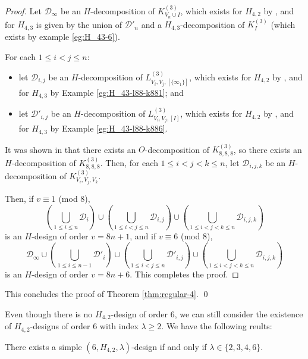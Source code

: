 \begin{proof}
Let $\mathcal{D}_\infty$ be an $H$-decomposition of $K_{V_n \cup I}^{(3)}$,
  which exists for $H_{4,2}$ by \cite{bryant}, and for $H_{4,3}$ is given by
  the union of $\mathcal{D}'_n$ and a $H_{4,3}$-decomposition of $K_{I}^{(3)}$ (which exists by example \ref{eg:H_43-6}).


For each $1 \leq i < j \leq n$:
\begin{itemize}
  \item let $\mathcal{D}_{i,j}$ be an $H$-decomposition of $L_{V_i,V_j,[\{\infty_1\}]}^{(3)}$, which exists for $H_{4,2}$ by \cite{bryant}, and for $H_{4,3}$ by Example \ref{eg:H_43-l88-k881}; and
  \item let $\mathcal{D}'_{i,j}$ be an $H$-decomposition of $L_{V_i,V_j,[I]}^{(3)}$, which exists for $H_{4,2}$ by \cite{bryant}, and for $H_{4,3}$ by Example \ref{eg:H_43-l88-k886}.
\end{itemize}

It was shown in \cite{hanani} that there exists an $O$-decomposition of $K_{8,8,8}^{(3)}$, so there exists an $H$-decomposition of $K_{8,8,8}^{(3)}$.
Then, for each $1 \leq i < j < k \leq n$, let $\mathcal{D}_{i,j,k}$ be an $H$-decomposition of $K_{V_i,V_j,V_k}^{(3)}$.

Then, if $v \equiv 1$ (mod 8),
\[
    \left( \bigcup_{1 \leq i \leq n} \mathcal{D}_i \right)
    \cup \left( \bigcup_{1 \leq i < j \leq n} \mathcal{D}_{i,j} \right)
    \cup \left( \bigcup_{1 \leq i < j < k \leq n} \mathcal{D}_{i,j,k} \right)
\]
is an $H$-design of order $v = 8n+1$, and if $v \equiv 6$ (mod 8),
\[
    \mathcal{D}_\infty \cup \left( \bigcup_{1 \leq i \leq n-1}
    \mathcal{D}'_i \right) \cup \left( \bigcup_{1 \leq i < j \leq n}
    \mathcal{D}'_{i,j} \right) \cup \left( \bigcup_{1
    \leq i < j < k \leq n} \mathcal{D}_{i,j,k} \right)
\]
is an $H$-design of order $v = 8n+6$. This completes the proof.

\end{proof}

This concludes the proof of Theorem \ref{thm:regular-4}. \qed

Even though there is no $H_{4,2}$-design of order $6$, we can still consider the existence of $H_{4,2}$-designs of order $6$ with index $\lambda \geq 2$.
We have the following reults:

\begin{theorem} \label{thm:H_42-6-simple}
There exists a simple $(6, H_{4,2}, \lambda)$-design if and only if $\lambda \in \{2, 3, 4, 6\}$.
\end{theorem}

